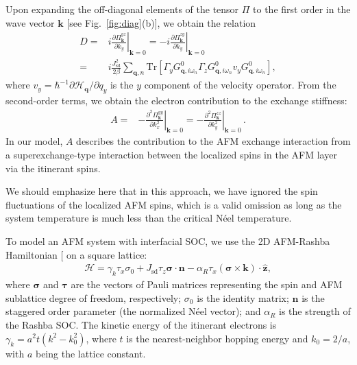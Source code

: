 \documentclass[aps,prl,twocolumn,amsmath,amssymb,superscriptaddress]{revtex4}%
\renewcommand{\cite}[1]{{[}\onlinecite{#1}{]}}
\newcommand{\pa}{\partial}
\newcommand{\lt}{\left}
\newcommand{\rt}{\right}
\newcommand{\bb}{\boldsymbol}
\begin{document}
Upon expanding the off-diagonal elements of the tensor $\Pi$ to the first order in the wave vector $\bm{k}$ [see Fig.~\ref{fig:diag}(b)], we obtain the relation
\begin{subequations}
\label{DMI-formula22}
\begin{align}
D=&\lt.i\frac{\partial\Pi^{yz}_{\bm{k}}}{\partial {k_y}} \rt|_{\bm{k}=0}=-\lt.i\frac{\partial\Pi^{zy}_{\bm{k}}}{\partial {k_y}} \rt|_{\bm{k}=0}\\
\label{DMI-formula2}
=&i\frac{J^2_{\mathrm{sd}}}{2\beta}\sum_{\bm{q},n}\mathrm{Tr}[\Gamma_y G^0_{\bm{q},i\omega_{n}}\Gamma_z G^0_{\bm{q},i\omega_{n}}v_y G^0_{\bm{q},i\omega_{n}}],
\end{align}
\end{subequations}
where $v_y=\hbar^{-1}\partial \mathcal{H}_{\bm{q}}/\pa q_y$ is the $y$ component of the velocity operator. From the second-order terms, we obtain the electron contribution to the exchange stiffness:
\begin{align}
\label{stiffness}
A=&-\lt.\frac{\partial^2\Pi^{yy}_{\bm{k}}}{\partial {k^2_x}} \rt|_{\bm{k}=0}=-\lt.\frac{\partial^2\Pi^{zz}_{\bm{k}}}{\partial {k^2_y}} \rt|_{\bm{k}=0} \, .
\end{align}
In our model, $A$ describes the contribution to the AFM exchange interaction from a superexchange-type interaction between the localized spins in the AFM layer via the itinerant spins.

We should emphasize here that in this approach, we have ignored the spin fluctuations of the localized AFM spins, which is a valid omission as long as the system temperature is much less than the critical N\'{e}el temperature.

To model an AFM system with interfacial SOC, we use the 2D AFM-Rashba Hamiltonian \cite{AFM-Hamiltonian1,AFM-Hamiltonian2} on a square lattice:
\begin{align}
\label{hamiltonian-AFM}
\mathcal{H}= \gamma_k \tau_x\sigma_0+J_{\mathrm{sd}} \tau_z\bm{\sigma}\cdot\bm{n}-\alpha_R \tau_x(\bm{\sigma}\times\bm{k})\cdot\hat{\bb{z}},
\end{align}
where $\bb{\sigma}$ and $\bb{\tau}$ are the vectors of Pauli matrices representing the spin and AFM sublattice degree of freedom, respectively; $\sigma_0$ is the identity matrix; $\bm{n}$ is the staggered order parameter (the normalized N\'{e}el vector); and $\alpha_R$ is the strength of the Rashba SOC. The kinetic energy of the itinerant electrons is $\gamma_k=a^2 t(k^2-k^2_0)$, where $t$ is the nearest-neighbor hopping energy and $k_0=2/a$, with $a$ being the lattice constant.
\end{document}
